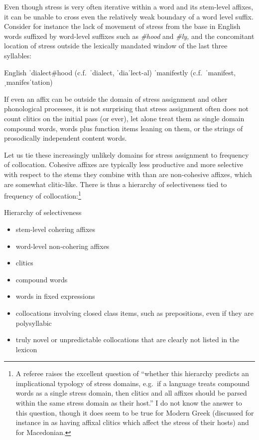 \documentclass[output=paper,
modfonts
]{LSP/langsci}
\begin{document}
Even though stress is very often iterative within a word and its stem-level affixes, it can be unable to cross even the relatively weak boundary of a word level suffix. Consider for instance the lack of movement of stress from the base in English words suffixed by word-level suffixes such as \textit{\#hood} and \textit{\#ly,} and the concomitant location of stress outside the lexically mandated window of the last three syllables:

\ea English
	\ea ˈdialect\#hood (c.f.\ ˈdialect, ˈdiaˈlect-al)
	\ex ˈmanifestly (c.f.\ ˈmanifest, ˌmanifesˈtation)
	\z
\z

\noindent If even an affix can be outside the domain of stress assignment and other phonological processes, it is not surprising that stress assignment often does not count clitics on the initial pass (or ever), let alone treat them as single domain compound words, words plus function items leaning on them, or the strings of prosodically independent content words. 

Let us tie these increasingly unlikely domains for stress assignment to frequency of collocation. Cohesive affixes are typically less productive and more selective with respect to the stems they combine with than are non-cohesive affixes, which are somewhat clitic-like. There is thus a hierarchy of selectiveness tied to frequency of collocation:\footnote{A referee raises the excellent question of “whether this hierarchy predicts an implicational typology of stress domains, e.g.\ if a language treats compound words as a single stress domain, then clitics and all affixes should be parsed within the same stress domain as their host.” I do not know the answer to this question, though it does seem to be true for Modern Greek (discussed for instance in \citealt{anderson2011} as having affixal clitics which affect the stress of their hosts) and for Macedonian.} 

\ea Hierarchy of selectiveness
\begin{itemize}
\item stem-level cohering affixes 
\item word-level non-cohering affixes 
\item clitics
\item compound words
\item words in fixed expressions 
\item collocations involving closed class items, such as prepositions, even if they are polysyllabic
\item truly novel or unpredictable collocations that are clearly not listed in the lexicon
\end{itemize}
\z
\end{document}
